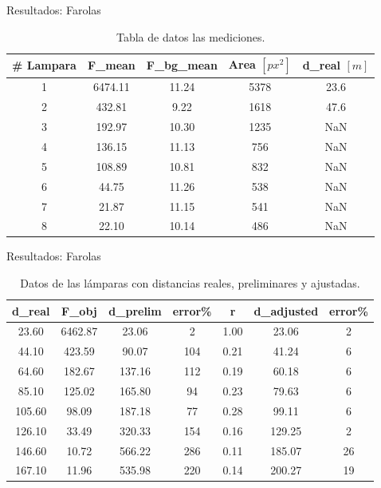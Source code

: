 \documentclass{beamer}
\begin{document}
\begin{frame}{Resultados: Farolas}
  \begin{table}[H]
  \centering
  \begin{tabular}{|c|c|c|c|c|}
  \hline
  \textbf{\# Lampara} & \textbf{F\_mean} & \textbf{F\_bg\_mean} & \textbf{Area} $[px^2]$ & \textbf{d\_real} $[m]$ \\ \hline
  1 & 6474.11 & 11.24 & 5378 & 23.6 \\ \hline
  2 & 432.81  & 9.22  & 1618 & 47.6 \\ \hline
  3 & 192.97  & 10.30 & 1235 & NaN  \\ \hline
  4 & 136.15  & 11.13 & 756  & NaN  \\ \hline
  5 & 108.89  & 10.81 & 832  & NaN  \\ \hline
  6 & 44.75   & 11.26 & 538  & NaN  \\ \hline
  7 & 21.87   & 11.15 & 541  & NaN  \\ \hline
  8 & 22.10   & 10.14 & 486  & NaN  \\ \hline
  \end{tabular}
  \caption{Tabla de datos las mediciones.}
  \label{tab:lamps}
  \end{table}
\end{frame}


\begin{frame}{Resultados: Farolas}
\begin{table}[H]
\centering
\begin{tabular}{|c|c|c|c|c|c|c|}
\hline
\textbf{d\_real} & \textbf{F\_obj} & \textbf{d\_prelim} & \textbf{error\%} & \textbf{r} & \textbf{d\_adjusted} & \textbf{error\%} \\ \hline
23.60 & 6462.87 & 23.06 & 2  & 1.00 & 23.06 & 2  \\ \hline
44.10 & 423.59  & 90.07 & 104 & 0.21 & 41.24 & 6  \\ \hline
64.60 & 182.67  & 137.16 & 112 & 0.19 & 60.18 & 6  \\ \hline
85.10 & 125.02  & 165.80 & 94  & 0.23 & 79.63 & 6  \\ \hline
105.60 & 98.09  & 187.18 & 77  & 0.28 & 99.11 & 6  \\ \hline
126.10 & 33.49  & 320.33 & 154 & 0.16 & 129.25 & 2  \\ \hline
146.60 & 10.72  & 566.22 & 286 & 0.11 & 185.07 & 26 \\ \hline
167.10 & 11.96  & 535.98 & 220 & 0.14 & 200.27 & 19 \\ \hline
\end{tabular}
\caption{Datos de las lámparas con distancias reales, preliminares y ajustadas.}
\label{tab:analisis}
\end{table}
\end{frame}
\end{document}
